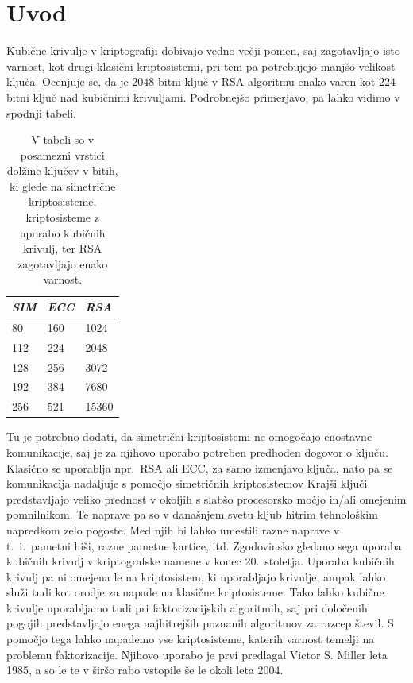 \documentclass[12pt,a4paper,twoside]{article}
\theoremstyle{definition} %
\theoremstyle{plain} %
\numberwithin{equation}{section}  %
\begin{document}
\section{Uvod}
Kubične krivulje v kriptografiji dobivajo vedno večji pomen, saj zagotavljajo isto varnost, kot drugi klasični kriptosistemi, pri tem pa potrebujejo manjšo velikost ključa. Ocenjuje se, da je $2048$ bitni ključ v RSA algoritmu enako varen kot $224$ bitni ključ nad kubičnimi krivuljami. Podrobnejšo primerjavo, pa lahko vidimo v spodnji tabeli.

\begin{table}[h]
\centering
\begin{tabular}{|l|l|l|}
\hline
\textit{\textbf{SIM}} & \textit{\textbf{ECC}} & \textit{\textbf{RSA}} \\ \hline
80                    & 160                   & 1024                  \\ \hline
112                   & 224                   & 2048                  \\ \hline
128                   & 256                   & 3072                  \\ \hline
192                   & 384                   & 7680                  \\ \hline
256                   & 521                   & 15360                 \\ \hline
\end{tabular}
 \caption[Primerjava kriptosistemov.]{V tabeli so v posamezni vrstici dolžine ključev v bitih, ki glede na simetrične kriptosisteme, kriptosisteme z uporabo kubičnih krivulj, ter RSA zagotavljajo enako varnost.}
\end{table}
Tu je potrebno dodati, da simetrični kriptosistemi ne omogočajo enostavne komunikacije, saj je za njihovo uporabo potreben predhoden dogovor o ključu. Klasično se uporablja npr.\ RSA ali ECC,  za samo izmenjavo ključa, nato pa se komunikacija nadaljuje s pomočjo simetričnih kriptosistemov
Krajši ključi predstavljajo veliko prednost v okoljih s slabšo procesorsko močjo in/ali omejenim pomnilnikom. Te naprave pa so v današnjem svetu kljub hitrim tehnološkim napredkom zelo pogoste. Med njih bi lahko umestili razne naprave v t.\ i.\  pametni hiši, razne pametne kartice, itd. Zgodovinsko gledano sega uporaba kubičnih krivulj v kriptografske namene v konec 20.\ stoletja. Uporaba kubičnih krivulj pa ni omejena le na kriptosistem, ki uporabljajo krivulje, ampak lahko služi tudi kot orodje za napade na klasične kriptosisteme. Tako lahko kubične krivulje uporabljamo tudi pri faktorizacijskih algoritmih, saj pri določenih pogojih predstavljajo enega najhitrejših poznanih algoritmov za razcep števil. S pomočjo tega lahko napademo vse kriptosisteme, katerih varnost temelji na problemu faktorizacije.  Njihovo uporabo je prvi predlagal Victor S. Miller leta 1985, a so le te v širšo rabo vstopile še le okoli leta 2004.
\end{document}
